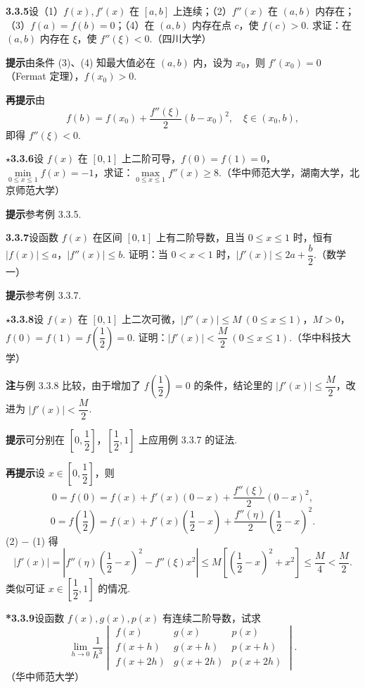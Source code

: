 \documentclass[UTF8, 12pt, fontset=fandol, oneside]{ctexart}
\begin{document}
\noindent\textbf{3.3.5}\quad 设（1）$f(x),f'(x)$ 在 $[a,b]$ 上连续；（2）$f''(x)$ 在 $(a,b)$ 内存在；（3）$f(a)=f(b)=0$；（4）在 $(a,b)$ 内存在点 $c$，使 $f(c)>0$. 求证：在 $(a,b)$ 内存在 $\xi$，使 $f''(\xi)<0$.（四川大学）

\noindent\textbf{提示}\quad 由条件 (3)、(4) 知最大值必在 $(a,b)$ 内，设为 $x_0$，则 $f'(x_0)=0$（Fermat 定理），$f(x_0)>0$.

\noindent\textbf{再提示}\quad 由
\[
  f(b)=f(x_0)+\frac{f''(\xi)}2(b-x_0)^2,\quad \xi\in(x_0,b),
\]
即得 $f''(\xi)<0$.

\noindent\textbf{$\star$3.3.6}\quad 设 $f(x)$ 在 $[0,1]$ 上二阶可导，$f(0)=f(1)=0$，$\min\limits_{0\le x\le1}f(x)=-1$，求证：$\max\limits_{0\le x\le1}f''(x)\ge8$.（华中师范大学，湖南大学，北京师范大学）

\noindent\textbf{提示}\quad 参考例 3.3.5.

\noindent\textbf{3.3.7}\quad 设函数 $f(x)$ 在区间 $[0,1]$ 上有二阶导数，且当 $0\le x\le1$ 时，恒有 $|f(x)|\le a$，$|f''(x)|\le b$. 证明：当 $0<x<1$ 时，$|f'(x)|\le2a+\dfrac b2$.（数学一）

\noindent\textbf{提示}\quad 参考例 3.3.7.

\noindent\textbf{$\star$3.3.8}\quad 设 $f(x)$ 在 $[0,1]$ 上二次可微，$|f''(x)|\le M\ (0\le x\le1)$，$M>0$，$f(0)=f(1)=f\left(\dfrac12\right)=0$. 证明：$|f'(x)|<\dfrac M2\ (0\le x\le1)$.（华中科技大学）

\noindent\textbf{注}\quad 与例 3.3.8 比较，由于增加了 $f\left(\dfrac12\right)=0$ 的条件，结论里的 $|f'(x)|\le\dfrac M2$，改进为 $|f'(x)|<\dfrac M2$.

\noindent\textbf{提示}\quad 可分别在 $\left[0,\dfrac12\right]$，$\left[\dfrac12,1\right]$ 上应用例 3.3.7 的证法.

\noindent\textbf{再提示}\quad 设 $x\in\left[0,\dfrac12\right]$，则
\[
  0=f(0)=f(x)+f'(x)(0-x)+\frac{f''(\xi)}2(0-x)^2, \tag{1}
\]
\[
  0=f\left(\frac12\right)=f(x)+f'(x)\left(\frac12-x\right)
  +\frac{f''(\eta)}2\left(\frac12-x\right)^2. \tag{2}
\]
(2) $-$ (1) 得
\[
  |f'(x)|=\left|f''(\eta)\left(\frac12-x\right)^2-f''(\xi)x^2\right|
  \le M\left[\left(\frac12-x\right)^2+x^2\right]\le\frac M4<\frac M2.
\]
类似可证 $x\in\left[\dfrac12,1\right]$ 的情况.

\noindent\textbf{*3.3.9}\quad 设函数 $f(x),g(x),p(x)$ 有连续二阶导数，试求
\[
  \lim_{h\to0}\frac1{h^3}
  \begin{vmatrix}
  f(x)&g(x)&p(x)\\
  f(x+h)&g(x+h)&p(x+h)\\
  f(x+2h)&g(x+2h)&p(x+2h)
  \end{vmatrix}.
\]
（华中师范大学）
\end{document}
